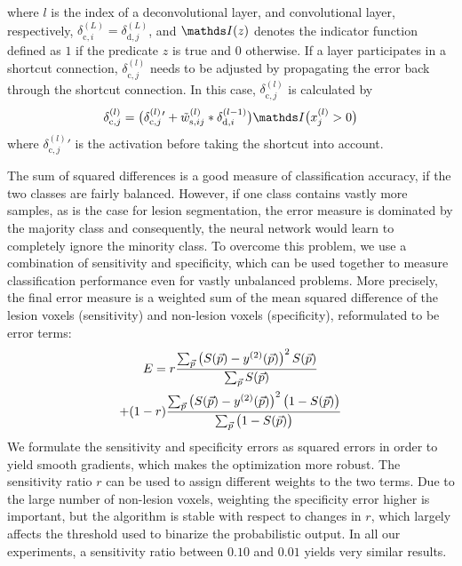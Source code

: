 where $l$ is the index of a deconvolutional layer, and convolutional layer,
respectively, $\delta^{(L)}_{\text{c},i} = \delta^{(L)}_{\text{d},j}$, and
$\I(z)$ denotes the indicator function defined as $1$ if the predicate $z$ is
true and $0$ otherwise. If a layer participates in a shortcut connection,
$\delta^{(l)}_{\text{c},j}$ needs to be adjusted by propagating the error back
through the shortcut connection. In this case, $\delta^{(l)}_{\text{c},j}$ is
calculated by
\begin{equation}
\delta^{(l)}_{\text{c},j} =
\big(\delta^{(l)}_{\text{c},j}{}'+
\tilde{w}^{(l)}_{\text{s},ij}*\delta^{(l-1)}_{\text{d},i}\big)\I\big(x^{(l)}_j
> 0\big)
\label{eq:deltas}
\end{equation}
where $\delta^{(l)}_{\text{c},j}{}'$ is the activation before taking the
shortcut into account.


The sum of squared differences is a good measure of classification accuracy, if
the two classes are fairly balanced. However, if one class contains vastly more
samples, as is the case for lesion segmentation, the error measure is dominated
by the majority class and consequently, the neural network would learn to
completely ignore the minority class. To overcome this problem, we use a
combination of sensitivity and specificity, which can be used together to
measure classification performance even for vastly unbalanced problems. More
precisely, the final error measure is a weighted sum of the mean squared
difference of the lesion voxels (sensitivity) and non-lesion voxels
(specificity), reformulated to be error terms:
\begin{multline} 
E = r\frac{\textstyle\sum_{\vect{p}} \left(S(\vect{p}) -
y^{(2)}(\vect{p})\right)^2 S(\vect{p})}{\textstyle\sum_{\vect{p}} S(\vect{p})}
\\
 + (1-r)\frac{\textstyle\sum_{\vect{p}} \left(S(\vect{p}) -
y^{(2)}(\vect{p})\right)^2 \big(1 - S(\vect{p})\big)}{%
\textstyle\sum_{\vect{p}}\big(1 - S(\vect{p})\big)}
\end{multline}
We formulate the sensitivity and specificity errors as squared errors in order
to yield smooth gradients, which makes the optimization more robust. The
sensitivity ratio $r$ can be used to assign different weights to the two terms.
Due to the large number of non-lesion voxels, weighting the specificity error
higher is important, but the algorithm is stable with respect to changes in $r$,
which largely affects the threshold used to binarize the probabilistic output.
In all our experiments, a sensitivity ratio between $0.10$ and $0.01$ yields
very similar results.

